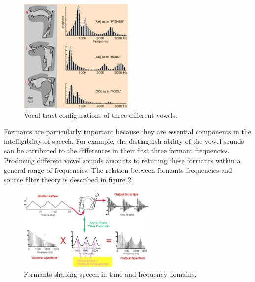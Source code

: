 \documentclass[12pt, a4paper, twoside]{report}
\begin{document}
\begin{figure}[!h]
	\centering
	\includegraphics[width=0.5\textwidth]
	{images/chapter2/vocal-tract-vowel}
	\caption{Vocal tract configurations of three different vowels.}
	\label{fig:vocal-tract-vowel}
\end{figure}

Formants are particularly important because they are essential components in the intelligibility of speech. For example, the distinguish-ability of the vowel sounds can be attributed to the differences in their first three formant frequencies. Producing different vowel sounds amounts to retuning these formants within a general range of frequencies. The relation between formants frequencies and source filter theory is described in figure \ref{fig:formant-time-freq}.

\begin{figure}[!h]
	\centering
	\includegraphics[width=0.6\textwidth]
	{images/chapter2/formant-time-freq}
	\caption{Formants shaping speech in time and frequency domains.}
	\label{fig:formant-time-freq}
\end{figure}
\end{document}
